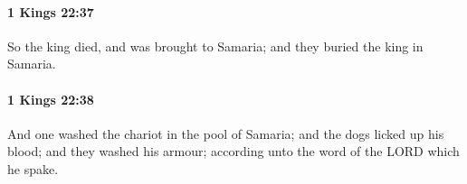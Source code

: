 		\paragraph{1 Kings 22:37} %
			\label{1KINGS-22-37}

			So the king died, and was brought to Samaria; and they buried the king in Samaria.


		\paragraph{1 Kings 22:38} %
			\label{1KINGS-22-38}

			And one washed the chariot in the pool of Samaria; and the dogs licked up his blood; and they washed his armour; according unto the word of the LORD which he spake.


